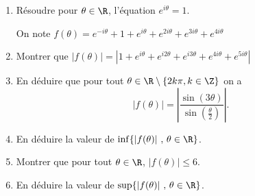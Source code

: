 




\begin{exercice}
\begin{enumerate}
\item Résoudre pour $\theta\in \R$, l'équation $e^{i\theta}=1$.

On note $f(\theta) = e^{-i \theta} +1 +e^{i \theta}+e^{2i \theta}+e^{3i \theta}+e^{4i \theta}$
\item Montrer que $|f(\theta)|=\left| 1+e^{i \theta}+e^{i2 \theta}+e^{i3 \theta}+e^{4i \theta}+e^{5i \theta}\right|$
\item En déduire que pour tout $\theta \in \R\setminus\{ 2k\pi , k \in \Z\}$ on a 
$$\left| f(\theta)\right| = \left|\frac{\sin(3\theta)}{ \sin(\frac{\theta}{2})}\right|.$$
\item En déduire la valeur de  $\inf\{ \left| f(\theta)\right|\, ,\,  \theta \in \R \}$. 
\item Montrer que pour tout $\theta \in \R$, $ \left| f(\theta)\right|\leq 6$.
\item En déduire la valeur de $\sup\{ \left| f(\theta)\right|\, ,\,  \theta \in \R\}$. 
\end{enumerate}
\end{exercice}

